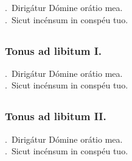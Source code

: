\documentclass[12pt]{article} %
\newenvironment{response}{\leftskip 0in \setlength{\parindent}{0in}}{\vspace{2 mm}}
\let\oldVbar\Vbar
\renewcommand{\Vbar}{\textcolor{benred8}{\oldVbar .}}
\let\oldRbar\Rbar
\renewcommand{\Rbar}{\textcolor{benred8}{\oldRbar .}}
\begin{document}
\gresetfirstlineaboveinitial{\small \textsc{ \textbf{\textcolor{benred8}{VIII}}}}{\small \textsc{ \textbf{\textcolor{benred8}{VIII}}}}

\begin{response}
\Vbar\ Dirig\'{a}tur D\'{o}mine or\'{a}tio mea.\\
\Rbar\ Sicut inc\'{e}nsum in consp\'{e}u tuo.

\end{response}


\subsection*{}

\subsubsection*{Tonus ad libitum I.}

\gresetfirstlineaboveinitial{\small \textsc{ \textbf{\textcolor{benred8}{VIII}}}}{\small \textsc{ \textbf{\textcolor{benred8}{VIII}}}}

\begin{response}
\Vbar\ Dirig\'{a}tur D\'{o}mine or\'{a}tio mea.\\
\Rbar\ Sicut inc\'{e}nsum in consp\'{e}u tuo.

\end{response}


\subsection*{}

\subsubsection*{Tonus ad libitum II.}

\gresetfirstlineaboveinitial{\small \textsc{ \textbf{\textcolor{benred8}{I}}}}{\small \textsc{ \textbf{\textcolor{benred8}{I}}}}

\begin{response}
\Vbar\ Dirig\'{a}tur D\'{o}mine or\'{a}tio mea.\\
\Rbar\ Sicut inc\'{e}nsum in consp\'{e}u tuo.

\end{response}
\end{document}
